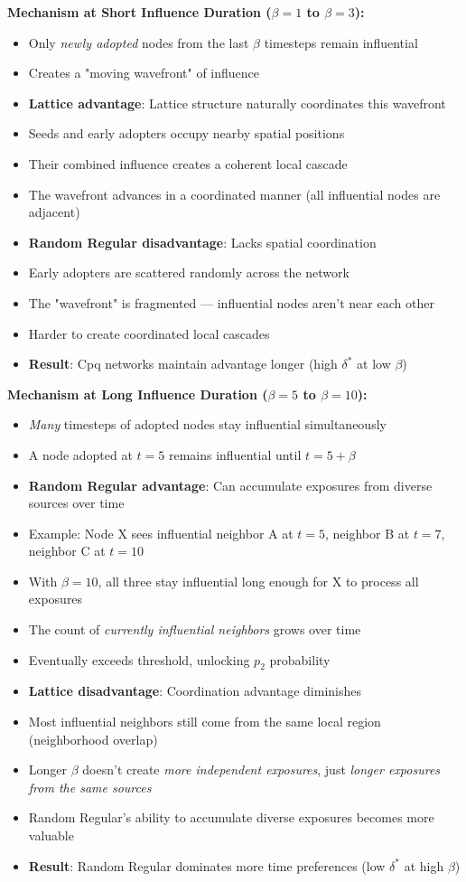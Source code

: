 \documentclass[12pt,a4paper]{article}
\begin{document}
\textbf{Mechanism at Short Influence Duration ($\beta=1$ to $\beta=3$):}
\begin{itemize}
    \item Only \textit{newly adopted} nodes from the last $\beta$ timesteps remain influential
    \item Creates a "moving wavefront" of influence
    \item \textbf{Lattice advantage}: Lattice structure naturally coordinates this wavefront
    \item Seeds and early adopters occupy nearby spatial positions
    \item Their combined influence creates a coherent local cascade
    \item The wavefront advances in a coordinated manner (all influential nodes are adjacent)
    \item \textbf{Random Regular disadvantage}: Lacks spatial coordination
    \item Early adopters are scattered randomly across the network
    \item The "wavefront" is fragmented --- influential nodes aren't near each other
    \item Harder to create coordinated local cascades
    \item \textbf{Result}: Cpq networks maintain advantage longer (high $\delta^*$ at low $\beta$)
\end{itemize}

\textbf{Mechanism at Long Influence Duration ($\beta=5$ to $\beta=10$):}
\begin{itemize}
    \item \textit{Many} timesteps of adopted nodes stay influential simultaneously
    \item A node adopted at $t=5$ remains influential until $t=5+\beta$
    \item \textbf{Random Regular advantage}: Can accumulate exposures from diverse sources over time
    \item Example: Node X sees influential neighbor A at $t=5$, neighbor B at $t=7$, neighbor C at $t=10$
    \item With $\beta=10$, all three stay influential long enough for X to process all exposures
    \item The count of \textit{currently influential neighbors} grows over time
    \item Eventually exceeds threshold, unlocking $p_2$ probability
    \item \textbf{Lattice disadvantage}: Coordination advantage diminishes
    \item Most influential neighbors still come from the same local region (neighborhood overlap)
    \item Longer $\beta$ doesn't create \textit{more independent exposures}, just \textit{longer exposures from the same sources}
    \item Random Regular's ability to accumulate diverse exposures becomes more valuable
    \item \textbf{Result}: Random Regular dominates more time preferences (low $\delta^*$ at high $\beta$)
\end{itemize}
\end{document}
